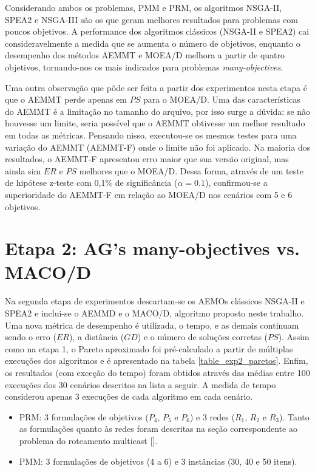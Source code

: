 Considerando ambos os problemas, PMM e PRM, os algoritmos NSGA-II, SPEA2 e NSGA-III são os que geram melhores resultados para problemas com poucos objetivos. A performance dos algoritmos clássicos (NSGA-II e SPEA2) cai consideravelmente a medida que se aumenta o número de objetivos, enquanto o desempenho dos métodos AEMMT e MOEA/D melhora a partir de quatro objetivos, tornando-nos os mais indicados para problemas \textit{many-objectives}.

Uma outra observação que pôde ser feita a partir dos experimentos nesta etapa é que o AEMMT perde apenas em $PS$ para o MOEA/D. Uma das características do AEMMT é a limitação no tamanho do arquivo, por isso surge a dúvida: se não houvesse um limite, seria possível que o AEMMT obtivesse um melhor resultado em todas as métricas. Pensando nisso, executou-se os mesmos testes para uma variação do AEMMT (AEMMT-F) onde o limite não foi aplicado. Na maioria dos resultados, o AEMMT-F apresentou erro maior que sua versão original, mas ainda sim $ER$ e $PS$ melhores que o MOEA/D. Dessa forma, através de um teste de hipótese z-teste com 0,1\% de significância ($\alpha = 0.1$), confirmou-se a superioridade do AEMMT-F em relação ao MOEA/D nos cenários com 5 e 6 objetivos.

\section{Etapa 2: AG's many-objectives vs. MACO/D}

Na segunda etapa de experimentos descartam-se os AEMOs clássicos NSGA-II e SPEA2 e inclui-se o AEMMD e o MACO/D, algoritmo proposto neste trabalho. Uma nova métrica de desempenho é utilizada, o tempo, e as demais continuam sendo o erro ($ER$), a distância ($GD$) e o número de soluções corretas ($PS$). Assim como na etapa 1, o Pareto aproximado foi pré-calculado a partir de múltiplas execuções dos algoritmos e é apresentado na tabela \ref{table_exp2_paretos}. Enfim, os resultados (com exceção do tempo) foram obtidos através das médias entre 100 execuções dos 30 cenários descritos na lista a seguir. A medida de tempo considerou apenas 3 execuções de cada algoritmo em cada cenário.

\begin{itemize}
	\item PRM: 3 formulações de objetivos ($P_4$, $P_5$ e $P_6$) e 3 redes ($R_1$, $R_2$ e $R_3$). Tanto as formulações quanto às redes foram descritas na seção correspondente ao problema do roteamento multicast [].
	\item PMM: 3 formulações de objetivos (4 a 6) e 3 instâncias (30, 40 e 50 itens).
\end{itemize}


